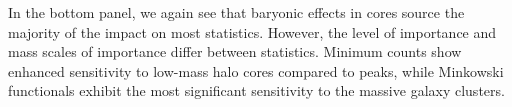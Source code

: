 \documentclass[linenumbers,trackchanges]{aastex701}
\begin{document}
In the bottom panel, we again see that baryonic effects in cores source the majority of the impact on most statistics. However, the level of importance and mass scales of importance differ between statistics. Minimum counts show enhanced sensitivity to low-mass halo cores compared to peaks, while Minkowski functionals exhibit the most significant sensitivity to the massive galaxy clusters.




\end{document}
